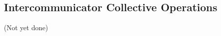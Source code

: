 \documentclass{article}
\begin{document}
\subsection{Intercommunicator Collective Operations}
(Not yet done)
\end{document}
